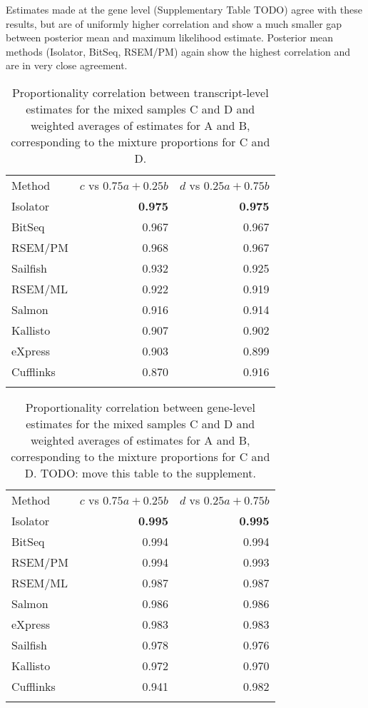\documentclass[twocolumn]{article}
\begin{document}
Estimates made at the gene level (Supplementary Table TODO) agree with
these results, but are of uniformly higher correlation and show a much
smaller gap between posterior mean and maximum likelihood estimate.
Posterior mean methods (Isolator, BitSeq, RSEM/PM) again show the
highest correlation and are in very close agreement.

\begin{table}\begin{tabular}[c]{@{}lrr@{}}
\toprule\addlinespace
Method & $c$ vs $0.75a + 0.25b$ & $d$ vs $0.25a + 0.75b$
\\\addlinespace
\midrule
Isolator & \textbf{0.975} & \textbf{0.975}
\\\addlinespace
BitSeq & 0.967 & 0.967
\\\addlinespace
RSEM/PM & 0.968 & 0.967
\\\addlinespace
Sailfish & 0.932 & 0.925
\\\addlinespace
RSEM/ML & 0.922 & 0.919
\\\addlinespace
Salmon & 0.916 & 0.914
\\\addlinespace
Kallisto & 0.907 & 0.902
\\\addlinespace
eXpress & 0.903 & 0.899
\\\addlinespace
Cufflinks & 0.870 & 0.916
\\\addlinespace
\bottomrule
\addlinespace
\end{tabular}
\caption{Proportionality correlation between transcript-level estimates
for the mixed samples C and D and weighted averages of estimates for A
and B, corresponding to the mixture proportions for C and D.}
\end{table}

\begin{table}\begin{tabular}[c]{@{}lrr@{}}
\toprule\addlinespace
Method & $c$ vs $0.75a + 0.25b$ & $d$ vs $0.25a + 0.75b$
\\\addlinespace
\midrule
Isolator & \textbf{0.995} & \textbf{0.995}
\\\addlinespace
BitSeq & 0.994 & 0.994
\\\addlinespace
RSEM/PM & 0.994 & 0.993
\\\addlinespace
RSEM/ML & 0.987 & 0.987
\\\addlinespace
Salmon & 0.986 & 0.986
\\\addlinespace
eXpress & 0.983 & 0.983
\\\addlinespace
Sailfish & 0.978 & 0.976
\\\addlinespace
Kallisto & 0.972 & 0.970
\\\addlinespace
Cufflinks & 0.941 & 0.982
\\\addlinespace
\bottomrule
\addlinespace
\end{tabular}
\caption{Proportionality correlation between gene-level estimates for
the mixed samples C and D and weighted averages of estimates for A and
B, corresponding to the mixture proportions for C and D. TODO: move this
table to the supplement.}
\end{table}
\end{document}
